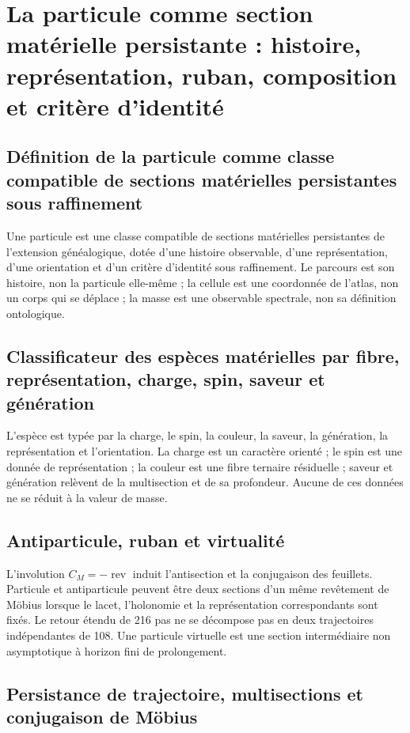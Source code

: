 \chapter{La particule comme section matérielle persistante : histoire, représentation, ruban, composition et critère d’identité}
\label{chap:particula-seccion-material-persistente}

\section{Définition de la particule comme classe compatible de sections matérielles persistantes sous raffinement}
Une particule est une classe compatible de sections matérielles persistantes de l’extension généalogique, dotée d’une histoire observable, d’une représentation, d’une orientation et d’un critère d’identité sous raffinement. Le parcours est son histoire, non la particule elle-même ; la cellule est une coordonnée de l’atlas, non un corps qui se déplace ; la masse est une observable spectrale, non sa définition ontologique.

\section{Classificateur des espèces matérielles par fibre, représentation, charge, spin, saveur et génération}
L’espèce est typée par la charge, le spin, la couleur, la saveur, la génération, la représentation et l’orientation. La charge est un caractère orienté ; le spin est une donnée de représentation ; la couleur est une fibre ternaire résiduelle ; saveur et génération relèvent de la multisection et de sa profondeur. Aucune de ces données ne se réduit à la valeur de masse.

\section{Antiparticule, ruban et virtualité}
L’involution \(C_M=-\operatorname{rev}\) induit l’antisection et la conjugaison des feuillets. Particule et antiparticule peuvent être deux sections d’un même revêtement de Möbius lorsque le lacet, l’holonomie et la représentation correspondants sont fixés. Le retour étendu de 216 pas ne se décompose pas en deux trajectoires indépendantes de 108. Une particule virtuelle est une section intermédiaire non asymptotique à horizon fini de prolongement.

\section{Persistance de trajectoire, multisections et conjugaison de Möbius}


